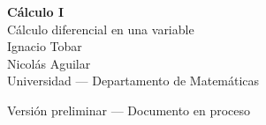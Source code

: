 \begin{titlepage}
    \centering
    \vspace*{2cm}

    {\Huge \textbf{Cálculo I}}\\[0.5cm]
    {\Large Cálculo diferencial en una variable}\\[2cm]

    {\large Ignacio Tobar \\ Nicolás Aguilar}\\[1.5cm]

    {\normalsize Universidad — Departamento de Matemáticas}\\[0.5cm]
    {\normalsize \the\year}

    \vfill
    {\small Versión preliminar — Documento en proceso}
\end{titlepage}
